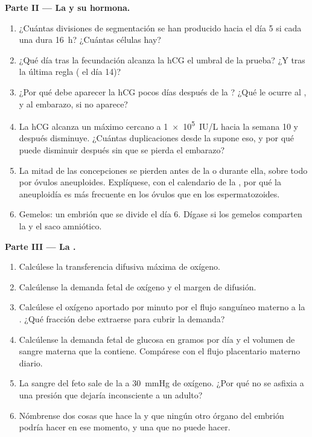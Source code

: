 \begin{problem}
\medskip
\noindent\textbf{Parte II --- La  y su hormona.}
\begin{enumerate}[resume]
  \item ¿Cuántas divisiones de segmentación se han producido hacia el
        día 5 si cada una dura \qty{16}{h}? ¿Cuántas células hay?
  \item ¿Qué día tras la fecundación alcanza la hCG el umbral de la
        prueba? ¿Y tras la última regla ( el día 14)?
  \item ¿Por qué debe aparecer la hCG pocos días después de la
        ? ¿Qué le ocurre al , y al embarazo, si no
        aparece?
  \item La hCG alcanza un máximo cercano a \qty{1e5}{IU/L} hacia la
        semana 10 y después disminuye. ¿Cuántas duplicaciones desde la
         supone eso, y por qué puede disminuir después sin que
        se pierda el embarazo?
  \item La mitad de las concepciones se pierden antes de la 
        o durante ella, sobre todo por óvulos aneuploides. Explíquese, con
        el calendario de la , por qué la aneuploidía es más
        frecuente en los óvulos que en los espermatozoides.
  \item Gemelos: un embrión que se divide el día 6. Dígase si los gemelos
        comparten la  y el saco amniótico.
\end{enumerate}

\medskip
\noindent\textbf{Parte III --- La .}
\begin{enumerate}[resume]
  \item Calcúlese la transferencia difusiva máxima de oxígeno.
  \item Calcúlense la demanda fetal de oxígeno y el margen de difusión.
  \item Calcúlese el oxígeno aportado por minuto por el flujo sanguíneo
        materno a la . ¿Qué fracción debe extraerse para cubrir la
        demanda?
  \item Calcúlense la demanda fetal de glucosa en gramos por día y el
        volumen de sangre materna que la contiene. Compárese con el flujo
        placentario materno diario.
  \item La sangre del feto sale de la  a \qty{30}{mmHg} de
        oxígeno. ¿Por qué no se asfixia a una presión que dejaría
        inconsciente a un adulto?
  \item Nómbrense dos cosas que hace la  y que ningún otro órgano
        del embrión podría hacer en ese momento, y una que no puede hacer.
\end{enumerate}


\end{problem}
